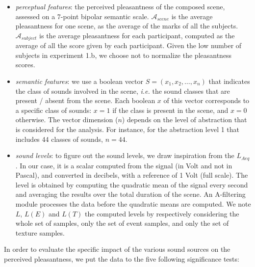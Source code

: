 \documentclass[12pt]{elsarticle}
\begin{document}
\begin{itemize}
\item \emph{perceptual features}: the perceived pleasantness of the composed scene, assessed on a 7-point bipolar semantic scale. $\mathcal{A}_{scene}$ is the average pleasantness for one scene, as the average of the marks of all the subjects. $\mathcal{A}_{subject}$ is the average pleasantness for each participant, computed as the average of all the score given by each participant. Given the low number of subjects in experiment 1.b, we choose not to normalize the pleasantness scores.

\item \emph{semantic features}: we use a boolean vector $S = (x_1, x_2, \ldots, x_n)$ that indicates the class of sounds involved in the scene, \textit{i.e.} the sound classes that are present / absent from the scene. Each boolean $x$ of this vector corresponds to a specific class of sounds: $x = 1$ if the class is present in the scene, and $x = 0$ otherwise. The vector dimension ($n$) depends on the level of abstraction that is considered for the analysis. For instance, for the abstraction level 1 that includes 44 classes of sounds, $n = 44$.

\item \emph{sound levels}: to figure out the sound levels, we draw inspiration from the $L_{Aeq}$. In our case, it is a scalar computed from the  signal (in Volt and not in Pascal), and converted in decibels, with a reference of 1 Volt (full scale). The level is obtained by computing the quadratic mean of the signal every second and averaging the results over the total duration of the scene. An A-filtering module processes the data before the quadratic means are computed. We note $L$, $L(E)$ and $L(T)$ the computed levels by respectively considering the whole set of samples, only the set of event samples, and only the set of texture samples.
\end{itemize}


In order to evaluate the specific impact of the various sound sources on the perceived pleasantness, we put the data to the five following significance tests:
\end{document}
